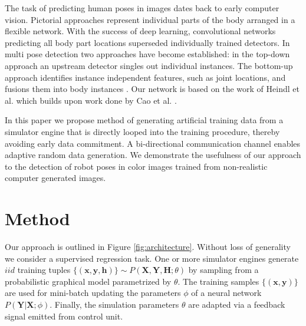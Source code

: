 \documentclass[conference]{IEEEtran}
\begin{document}
The task of predicting human poses in images dates back to early computer vision. Pictorial approaches \cite{fischler1973representation, felzenszwalb2005pictorial} represent individual parts of the body arranged in a flexible network. With the success of deep learning, convolutional networks \cite{oliveira2016deep} predicting all body part locations superseded individually trained detectors. In multi pose detection two approaches have become established: in the top-down approach \cite{gkioxari2014using, sun2011articulated} an upstream detector singles out individual instances. The bottom-up approach identifies instance independent features, such as joint locations, and fusions them into body instances \cite{insafutdinov2016deepercut, wei2016convolutional}. Our network is based on the work of Heindl et al. \cite{cheind2019disp} which builds upon work done by Cao et al. \cite{cao2017realtime}.

In this paper we propose method of generating artificial training data from a simulator engine that is directly looped into the training procedure, thereby avoiding early data commitment. A bi-directional communication channel enables adaptive random data generation. We demonstrate the usefulness of our approach to the detection of robot poses in color images trained from non-realistic computer generated images.




\section{Method}

    Our approach is outlined in Figure \ref{fig:architecture}. Without loss of generality we consider a supervised regression task. One or more simulator engines generate $iid$ training tuples $\{(\textbf{x},\textbf{y},\textbf{h})\} \sim P(\textbf{X},\textbf{Y},\textbf{H};\theta)$ by sampling from a probabilistic graphical model parametrized by $\theta$. The training samples $\{(\textbf{x},\textbf{y})\}$ are used for mini-batch updating the parameters $\phi$ of a neural network $P(\textbf{Y} \lvert \textbf{X};\phi)$. Finally, the simulation parameters $\theta$ are adapted via a feedback signal emitted from control unit.
\end{document}
